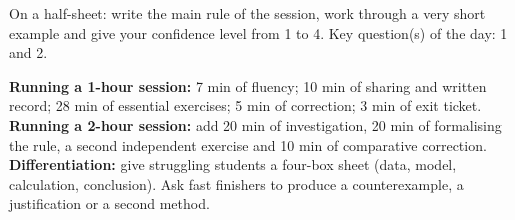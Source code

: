 \begin{sortie}On a half-sheet: write the main rule of the session, work through a very short example and give your confidence level from 1 to 4. Key question(s) of the day: 1 and 2.\end{sortie}

\ifprof
\begin{methode}
\textbf{Running a 1-hour session:} 7 min of fluency; 10 min of sharing and written record; 28 min of essential exercises; 5 min of correction; 3 min of exit ticket.\\
\textbf{Running a 2-hour session:} add 20 min of investigation, 20 min of formalising the rule, a second independent exercise and 10 min of comparative correction.\\
\textbf{Differentiation:} give struggling students a four-box sheet (data, model, calculation, conclusion). Ask fast finishers to produce a counterexample, a justification or a second method.
\end{methode}
\fi
